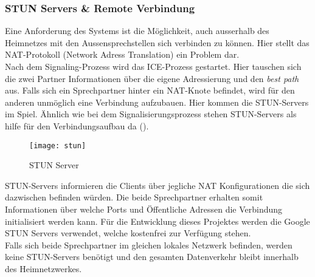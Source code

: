 \subsubsection{STUN Servers \& Remote Verbindung}
Eine Anforderung des Systems ist die Möglichkeit, auch ausserhalb des Heimnetzes mit den Aussensprechstellen sich verbinden zu können. Hier stellt das NAT-Protokoll (Network Adress Translation) ein Problem dar.
\\
Nach dem Signaling-Prozess wird das ICE-Prozess gestartet. Hier tauschen sich die zwei Partner Informationen über die eigene Adressierung und den \textit{best path} aus. Falls sich ein Sprechpartner hinter ein NAT-Knote befindet, wird für den anderen unmöglich eine Verbindung aufzubauen. Hier kommen die STUN-Servers im Spiel. Ähnlich wie bei dem Signalisierungsprozess stehen STUN-Servers als hilfe für den Verbindungsaufbau da (). 
\begin{figure}[htb!]
	\begin{center}
		\texttt{[image: stun]}
		\caption[STUN Server]{STUN Server}
		\label{fig:stun}
	\end{center}
\end{figure}
 STUN-Servers informieren die Clients über jegliche NAT Konfigurationen die sich dazwischen befinden würden. Die beide Sprechpartner erhalten somit Informationen über welche Ports und Öffentliche Adressen die Verbindung initialisiert werden kann. Für die Entwicklung dieses Projektes werden die Google STUN Servers verwendet, welche kostenfrei zur Verfügung stehen.
\\
Falls sich beide Sprechpartner im gleichen lokales Netzwerk befinden, werden keine STUN-Servers benötigt und den gesamten Datenverkehr bleibt innerhalb des Heimnetzwerkes.


\newpage